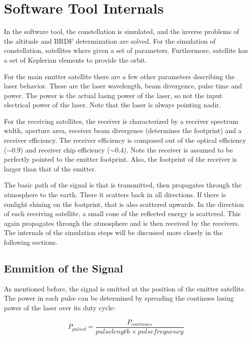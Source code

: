\section{Software Tool Internals}
\label{SoftwareToolInternals}

In the software tool, the constellation is simulated, and the inverse problems of the altitude and BRDF determination are solved. For the simulation of constellation, satellites where given a set of parameters. Furthermore, satellite has a set of Keplerian elements to provide the orbit. 

For the main emitter satellite there are a few other parameters describing the laser behavior. These are the laser wavelength, beam divergence, pulse time and power. The power is the actual lasing power of the laser, so not the input electrical power of the laser. Note that the laser is always pointing nadir.

For the receiving satellites, the receiver is characterized by a receiver spectrum width, aperture area, receiver beam divergence (determines the footprint) and a receiver efficiency. The receiver efficiency is composed out of the optical efficiency ($\sim0.9$) and receiver chip efficiency ($\sim0.4$). Note the receiver is assumed to be perfectly pointed to the emitter footprint. Also, the footprint of the receiver is larger than that of the emitter.

The basic path of the signal is that is transmitted, then propagates through the atmosphere to the earth. There it scatters back in all directions. If there is sunlight shining on the footprint, that is also scattered upwards. In the direction of each receiving satellite, a small cone of the reflected energy is scattered. This again propagates through the atmosphere and is then received by the receivers. The internals of the simulation steps will be discussed more closely in the following sections.

\subsection{Emmition of the Signal}

As mentioned before, the signal is emitted at the position of the emitter satellite. The power in each pulse can be determined by spreading the continues lasing power of the laser over its duty cycle:

\begin{equation}
	P_{pulsed} =  \frac{P_{continues}}{pulse length \times pulse frequency}
\end{equation}

